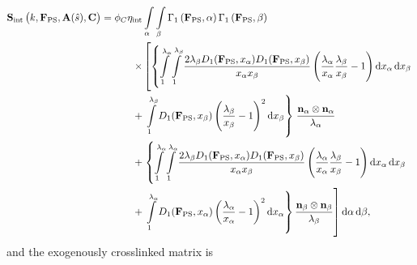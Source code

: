 \begin{equation} \label{eq:fullinteractions}
\begin{split}
\mathbf{S}_\mathrm{int}\left(k , \mathbf{F}_\mathrm{PS}, \mathbf{A}(\hat{s}), \mathbf{C}\right) = \phi_C \eta_\mathrm{int}& \int\displaylimits_\alpha \int\displaylimits_\beta \Gamma_1 \left(\mathbf{F}_\mathrm{PS}, \alpha \right) \Gamma_1 \left(\mathbf{F}_\mathrm{PS},  \beta \right) \\
\times&\left[ \left\lbrace 
\int\displaylimits_1^{\lambda_\alpha} \int\displaylimits_1^{\lambda_\beta} 
\frac{2 \lambda_\beta D_1(\mathbf{F}_\mathrm{PS}, x_\alpha) D_1(\mathbf{F}_\mathrm{PS}, x_\beta)}{x_\alpha x_\beta} 
\left( \frac{\lambda_\alpha}{x_\alpha} \frac{\lambda_\beta}{x_\beta} - 1\right) \mathrm{d}x_\alpha \, \mathrm{d}x_\beta \right.\right. \\
+& \left. \left. \int\displaylimits_1^{\lambda_\beta} D_1(\mathbf{F}_\mathrm{PS}, x_\beta) \left( \frac{\lambda_\beta}{x_\beta} -1  \right)^2 \mathrm{d}x_\beta \right\rbrace \right.  \frac{\mathbf{n}_\alpha \otimes \mathbf{n}_\alpha}{\lambda_\alpha}  \\
+& \left. \left\lbrace
\int\displaylimits_1^{\lambda_\alpha} \int\displaylimits_1^{\lambda_\alpha} 
\frac{2 \lambda_\beta D_1(\mathbf{F}_\mathrm{PS}, x_\alpha) D_1(\mathbf{F}_\mathrm{PS}, x_\beta)}{x_\alpha x_\beta} 
\left( \frac{\lambda_\alpha}{x_\alpha} \frac{\lambda_\beta}{x_\beta} - 1\right) \mathrm{d}x_\alpha \, \mathrm{d}x_\beta 
\right. \right. \\
+&\left. \left. \int\displaylimits_1^{\lambda_\alpha} D_1(\mathbf{F}_\mathrm{PS}, x_\alpha) \left( \frac{\lambda_\alpha}{x_\alpha} -1  \right)^2 \mathrm{d}x_\alpha \right\rbrace \frac{\mathbf{n}_\beta \otimes \mathbf{n}_\beta}{\lambda_\beta}  \right] \mathrm{d}\alpha \, \mathrm{d}\beta,
\end{split}
\end{equation}
and the exogenously crosslinked matrix is
